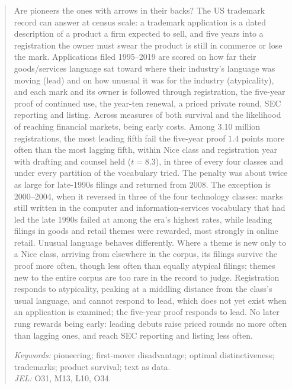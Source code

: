 \begin{abstract}
\noindent Are pioneers the ones with arrows in their backs? The US
trademark record can answer at census scale: a trademark application is
a dated description of a product a firm expected to sell, and five years
into a registration the owner must swear the product is still in
commerce or lose the mark. Applications filed 1995--2019 are scored on
how far their goods/services language sat toward where their industry's
language was moving (lead) and on how unusual it was for the industry
(atypicality), and each mark and its owner is followed through
registration, the five-year proof of continued use, the year-ten
renewal, a priced private round, SEC reporting and listing. Across
measures of both survival and the likelihood of reaching financial
markets, being early costs. Among 3.10 million registrations, the most
leading fifth fail the five-year proof $1.4$ points more often than the
most lagging fifth, within Nice class and registration year with
drafting and counsel held ($t = 8.3$), in three of every four classes
and under every partition of the vocabulary tried. The penalty was about
twice as large for late-1990s filings and returned from 2008. The
exception is 2000--2004, when it reversed in three of the four
technology classes: marks still written in the computer and
information-services vocabulary that had led the late 1990s failed at
among the era's highest rates, while leading filings in goods and retail
themes were rewarded, most strongly in online retail. Unusual language
behaves differently. Where a theme is new only to a Nice class, arriving
from elsewhere in the corpus, its filings survive the proof more often,
though less often than equally atypical filings; themes new to the
entire corpus are too rare in the record to judge. Registration responds
to atypicality, peaking at a middling distance from the class's usual
language, and cannot respond to lead, which does not yet exist when an
application is examined; the five-year proof responds to lead. No later
rung rewards being early: leading debuts raise priced rounds no more
often than lagging ones, and reach SEC reporting and listing less often.

\medskip
\noindent\emph{Keywords:} pioneering; first-mover disadvantage; optimal
distinctiveness; trademarks; product survival; text as data.\\
\emph{JEL:} O31, M13, L10, O34.
\end{abstract}
